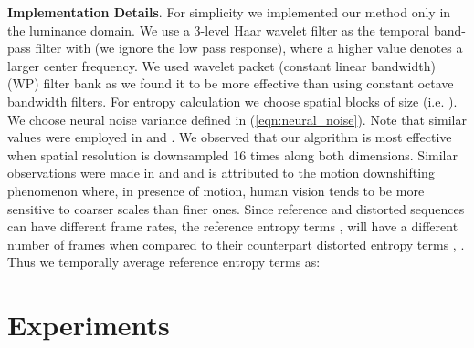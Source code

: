 \documentclass[journal]{IEEEtran}
\newcommand{\ie}{{i}.{e}.}
\begin{document}
\textbf{Implementation Details}. For simplicity we implemented our method only in the luminance domain. We use a 3-level Haar wavelet filter as the temporal band-pass filter  with  (we ignore the low pass response), where a higher  value denotes a larger center frequency. We used wavelet packet (constant linear bandwidth) (WP) filter bank \cite{coifman1992entropy} as we found it to be more effective than using constant octave bandwidth filters. For entropy calculation we choose spatial blocks of size  (\ie{ }). We choose neural noise variance  defined in (\ref{eqn:neural_noise}). Note that similar values were employed in \cite{sheikh2006image} and \cite{soundararajan2012rred}. We observed that our algorithm is most effective when spatial resolution is downsampled 16 times along both dimensions. Similar observations were made in \cite{soundararajan2012video} and \cite{bampis2017speed} and is attributed to the motion downshifting phenomenon where, in presence of motion, human vision tends to be more sensitive to coarser scales than finer ones. Since reference and distorted sequences can have different frame rates, the reference entropy terms ,  will have a different number of frames when compared to their counterpart distorted entropy terms , . Thus we temporally average reference entropy terms as:
\vspace{-2pt}



\section{Experiments}
\label{sec:experiments}
\end{document}
